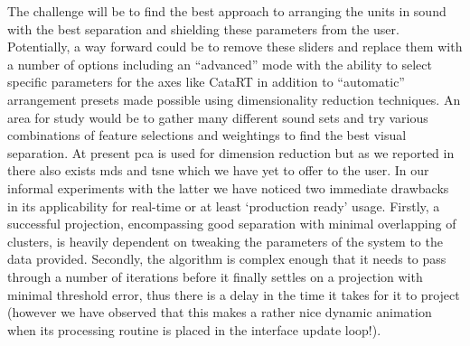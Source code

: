 The challenge will be to find the best approach to arranging the units in sound with the best separation and shielding these parameters from the user. Potentially, a way forward could be to remove these sliders and replace them with a number of options including an “advanced” mode with the ability to select specific parameters for the axes like CataRT in addition to “automatic” arrangement presets made possible using dimensionality reduction techniques. An area for study would be to gather many different sound sets and try various combinations of feature selections and weightings to find the best visual separation. At present \acrshort{pca} is used for dimension reduction but as we reported in  there also exists \acrshort{mds} and \acrshort{tsne} which we have yet to offer to the user. In our informal experiments with the latter we have noticed two immediate drawbacks in its applicability for real-time or at least `production ready' usage. Firstly, a successful projection, encompassing good separation with minimal overlapping of clusters, is heavily dependent on tweaking the parameters of the system to the data provided. Secondly, the algorithm is complex enough that it needs to pass through a number of iterations before it finally settles on a projection with minimal threshold error, thus there is a delay in the time it takes for it to project (however we have observed that this makes a rather nice dynamic animation when its processing routine is placed in the interface update loop!). 

